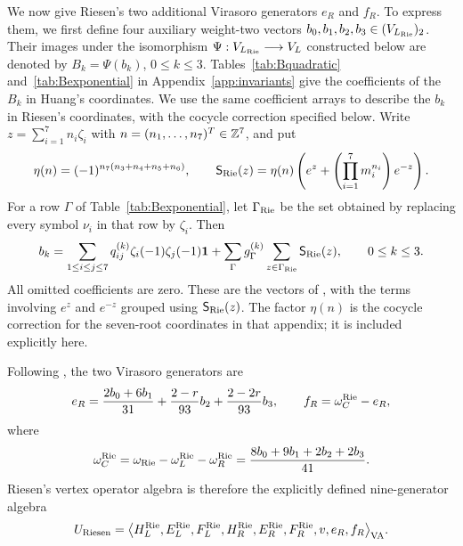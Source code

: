 \documentclass[11pt,reqno]{amsart}
\theoremstyle{definition}\newtheorem{definition}[theorem]{Definition}
\theoremstyle{remark}\newtheorem{remark}[theorem]{Remark}
\newcommand{\one}{\mathbf1}\newcommand{\slc}{\mathfrak{sl}_2}
\numberwithin{equation}{section}
\begin{document}
We now give Riesen's two additional Virasoro generators $e_R$ and $f_R$. To express them, we first define four auxiliary weight-two vectors $b_0,b_1,b_2,b_3\in(V_{L_{\rm Rie}})_2$. Their images under the isomorphism $\Psi:V_{L_{\rm Rie}}\longrightarrow V_L$ constructed below are denoted by $B_k=\Psi(b_k)$, $0\le k\le3$. Tables~\ref{tab:Bquadratic} and~\ref{tab:Bexponential} in Appendix~\ref{app:invariants} give the coefficients of the $B_k$ in Huang's coordinates. We use the same coefficient arrays to describe the $b_k$ in Riesen's coordinates, with the cocycle correction specified below. Write $z=\sum_{i=1}^7n_i\zeta_i$ with $n=(n_1,\ldots,n_7)^T\in\mathbb Z^7$, and put
\[
 \eta(n)=(-1)^{n_7(n_3+n_4+n_5+n_6)},\qquad
 \mathsf S_{\rm Rie}(z)
 =\eta(n)\left(e^z+\left(\prod_{i=1}^7m_i^{n_i}\right)e^{-z}\right).
\]
For a row $\Gamma$ of Table~\ref{tab:Bexponential}, let $\Gamma_{\rm Rie}$ be the set obtained by replacing every symbol $\nu_i$ in that row by $\zeta_i$. Then
\[
 b_k=\sum_{1\le i\le j\le7}q_{ij}^{(k)}\zeta_i(-1)\zeta_j(-1)\one
       +\sum_{\Gamma}g_\Gamma^{(k)}
          \sum_{z\in\Gamma_{\rm Rie}}\mathsf S_{\rm Rie}(z),
 \qquad 0\le k\le3.
\]
All omitted coefficients are zero. These are the vectors of \cite[Appendix C]{RiesenLong}, with the terms involving $e^z$ and $e^{-z}$ grouped using $\mathsf S_{\rm Rie}(z)$. The factor $\eta(n)$ is the cocycle correction for the seven-root coordinates in that appendix; it is included explicitly here.

Following \cite[Section 2.2, (2.5)--(2.6)]{RiesenLong}, the two Virasoro generators are
\[
 e_R=\frac{2b_0+6b_1}{31}
       +\frac{2-r}{93}b_2+\frac{2-2r}{93}b_3,
 \qquad f_R=\omega_C^{\rm Rie}-e_R,
\]
where
\[
 \omega_C^{\rm Rie}
 =\omega_{\rm Rie}-\omega_L^{\rm Rie}-\omega_R^{\rm Rie}
 =\frac{8b_0+9b_1+2b_2+2b_3}{41}.
\]
Riesen's vertex operator algebra is therefore the explicitly defined nine-generator algebra
\[
 U_{\rm Riesen}
 =\bigl\langle H_L^{\rm Rie},E_L^{\rm Rie},F_L^{\rm Rie},
               H_R^{\rm Rie},E_R^{\rm Rie},F_R^{\rm Rie},
               v,e_R,f_R\bigr\rangle_{\rm VA}.
\]
\end{document}
